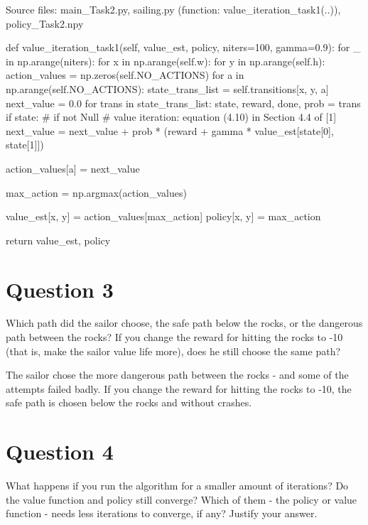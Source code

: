 \documentclass[12pt]{article}
\begin{document}
\noindent
Source files: main\_Task2.py, sailing.py (function: value\_iteration\_task1(..)), policy\_Task2.npy 

\begin{pycode}
def value_iteration_task1(self, value_est, policy, niters=100, gamma=0.9):
    for _ in np.arange(niters):
        for x in np.arange(self.w):
            for y in np.arange(self.h):
                action_values = np.zeros(self.NO_ACTIONS)
                for a in np.arange(self.NO_ACTIONS):
                    state_trans_list = self.transitions[x, y, a]
                    next_value = 0.0
                    for trans in state_trans_list:
                        state, reward, done, prob = trans
                        if state: # if not Null
                            # value iteration: equation (4.10) in Section 4.4 of [1]
                            next_value = next_value + prob * (reward + gamma * value_est[state[0], state[1]])

                    action_values[a] = next_value                                                

                max_action = np.argmax(action_values)
                
                value_est[x, y] = action_values[max_action]
                policy[x, y] = max_action

    return value_est, policy
\end{pycode}

\section*{Question 3}

Which path did the sailor choose, the safe path below the rocks, or the dangerous
path between the rocks? If you change the reward for hitting the rocks to -10 (that is, make the sailor value life more), does he still choose the same path?
\newline

The sailor chose the more dangerous path between the rocks - and some of the attempts failed badly. If you change the reward for hitting the rocks to -10, the safe path is chosen below the rocks and without crashes.
\pagebreak

\section*{Question 4}
What happens if you run the algorithm for a smaller amount of iterations?
Do the value function and policy still converge? Which of them - the policy or value function - needs less iterations to converge, if any? Justify your answer.
\newline
\end{document}
